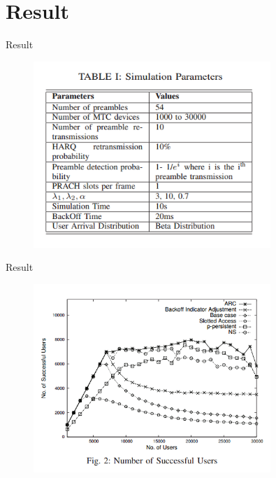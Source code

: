 \documentclass{beamer}
\begin{document}
\section{Result}
\begin{frame}{Result}
    \begin{figure}[t]
        \centering
        \includegraphics[width=0.8\textwidth]{figures/t1.png}
    \end{figure}
\end{frame}
\begin{frame}{Result}
    \begin{figure}[t]
        \centering
        \includegraphics[width=0.8\textwidth]{figures/f1.png}
    \end{figure}
\end{frame}
\end{document}
